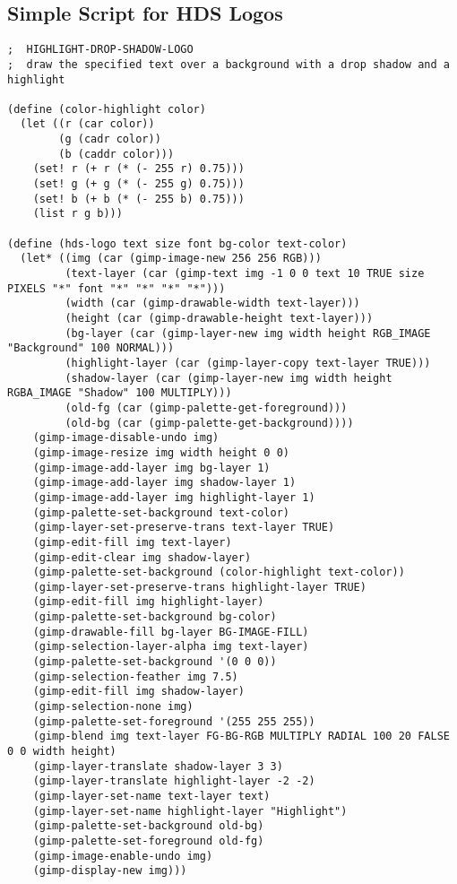 \documentclass{article}
\begin{document}
\subsection{Simple Script for HDS Logos}
{\scriptsize
\begin{verbatim}
;  HIGHLIGHT-DROP-SHADOW-LOGO
;  draw the specified text over a background with a drop shadow and a highlight

(define (color-highlight color)
  (let ((r (car color))
        (g (cadr color))
        (b (caddr color)))
    (set! r (+ r (* (- 255 r) 0.75)))
    (set! g (+ g (* (- 255 g) 0.75)))
    (set! b (+ b (* (- 255 b) 0.75)))
    (list r g b)))

(define (hds-logo text size font bg-color text-color)
  (let* ((img (car (gimp-image-new 256 256 RGB)))
         (text-layer (car (gimp-text img -1 0 0 text 10 TRUE size PIXELS "*" font "*" "*" "*" "*")))
         (width (car (gimp-drawable-width text-layer)))
         (height (car (gimp-drawable-height text-layer)))
         (bg-layer (car (gimp-layer-new img width height RGB_IMAGE "Background" 100 NORMAL)))
         (highlight-layer (car (gimp-layer-copy text-layer TRUE)))
         (shadow-layer (car (gimp-layer-new img width height RGBA_IMAGE "Shadow" 100 MULTIPLY)))
         (old-fg (car (gimp-palette-get-foreground)))
         (old-bg (car (gimp-palette-get-background))))
    (gimp-image-disable-undo img)
    (gimp-image-resize img width height 0 0)
    (gimp-image-add-layer img bg-layer 1)
    (gimp-image-add-layer img shadow-layer 1)
    (gimp-image-add-layer img highlight-layer 1)
    (gimp-palette-set-background text-color)
    (gimp-layer-set-preserve-trans text-layer TRUE)
    (gimp-edit-fill img text-layer)
    (gimp-edit-clear img shadow-layer)
    (gimp-palette-set-background (color-highlight text-color))
    (gimp-layer-set-preserve-trans highlight-layer TRUE)
    (gimp-edit-fill img highlight-layer)
    (gimp-palette-set-background bg-color)
    (gimp-drawable-fill bg-layer BG-IMAGE-FILL)
    (gimp-selection-layer-alpha img text-layer)
    (gimp-palette-set-background '(0 0 0))
    (gimp-selection-feather img 7.5)
    (gimp-edit-fill img shadow-layer)
    (gimp-selection-none img)
    (gimp-palette-set-foreground '(255 255 255))
    (gimp-blend img text-layer FG-BG-RGB MULTIPLY RADIAL 100 20 FALSE 0 0 width height)
    (gimp-layer-translate shadow-layer 3 3)
    (gimp-layer-translate highlight-layer -2 -2)
    (gimp-layer-set-name text-layer text)
    (gimp-layer-set-name highlight-layer "Highlight")
    (gimp-palette-set-background old-bg)
    (gimp-palette-set-foreground old-fg)
    (gimp-image-enable-undo img)
    (gimp-display-new img)))
\end{verbatim}}
\end{document}
